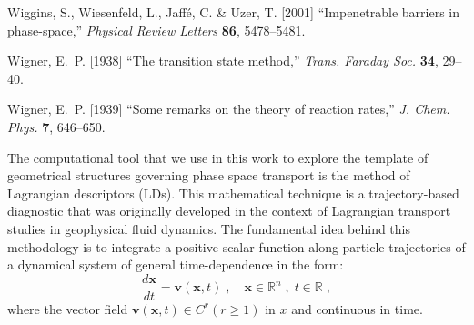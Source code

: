 \documentclass{ws-ijbc}
\begin{document}
\begin{thebibliography}{76}
	Wiggins, S., Wiesenfeld, L., Jaff{\'e}, C. \& Uzer, T. [2001{}]
	\enquote{Impenetrable barriers in phase-space,} \emph{Physical Review
		Letters} \textbf{86},  5478--5481.
	
	Wigner, E.~P. [1938] \enquote{{The transition state method},} \emph{Trans.
		Faraday Soc.} \textbf{34},  29--40.
	
	Wigner, E.~P. [1939] \enquote{{Some remarks on the theory of reaction rates},}
	\emph{J. Chem. Phys.} \textbf{7},  646--650.
	
\end{thebibliography}



\label{sec:appA}

The computational tool that we use in this work to explore the template of geometrical structures governing phase space transport is the method of Lagrangian descriptors (LDs). This mathematical technique is a trajectory-based diagnostic that was originally developed in the context of Lagrangian transport studies in geophysical fluid dynamics\cite{madrid2009,mancho2013lagrangian}. The fundamental idea behind this methodology is to integrate a positive scalar function along particle trajectories of a dynamical system of general time-dependence in the form:
\begin{equation}
\dfrac{d\mathbf{x}}{dt} = \mathbf{v}(\mathbf{x},t) \;,\quad \mathbf{x} \in \mathbb{R}^{n} \;,\; t \in \mathbb{R} \;,
\label{gtp_dynSys}
\end{equation}
where the vector field $\mathbf{v}(\mathbf{x},t) \in C^{r}  (r \geq 1)$ in $x$ and continuous in time. 
\end{document}
